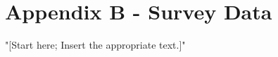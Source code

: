 \newpage
\section{\protect\centering Appendix B - Survey Data }
"[Start here; Insert the appropriate text.]"
